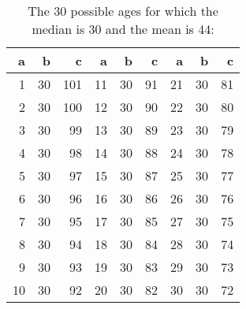  \begin{table}
\caption{The 30 possible ages for which the median is 30 and the mean is 44:}\label{medians}
\begin{center}
\begin{tabular}{rrr|rrr|rrr}
a &  b &  c &  a &  b &  c &  a &  b &  c\\ 
\hline
 1 &  30 &  101 &  11 &  30 &  91 &  21 &  30 &  81\\ 
2 &  30 &  100 &  12 &  30 &  90 &  22 &  30 &  80\\ 
3 &  30 &  99 &  13 &  30 &  89 &  23 &  30 &  79\\ 
4 &  30 &  98 &  14 &  30 &  88 &  24 &  30 &  78\\ 
5 &  30 &  97 &  15 &  30 &  87 &  25 &  30 &  77\\ 
6 &  30 &  96 &  16 &  30 &  86 &  26 &  30 &  76\\ 
7 &  30 &  95 &  17 &  30 &  85 &  27 &  30 &  75\\ 
8 &  30 &  94 &  18 &  30 &  84 &  28 &  30 &  74\\ 
9 &  30 &  93 &  19 &  30 &  83 &  29 &  30 &  73\\ 
10 &  30 &  92 &  20 &  30 &  82 &  30 &  30 &  72\\ 
\end{tabular}
\end{center}
\end{table}
\newcommand\mymedian{30}\newcommand\mymean{44}\newcommand\myconsidered{253460}\newcommand\mycount{30}
